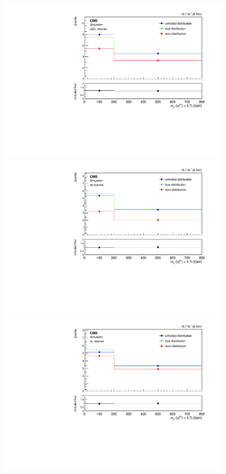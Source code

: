 \begin{figure}[hbtp]
\begin{center}
    \includegraphics[width=0.8\cmsFigWidth]{Figures/Unfolding/MCTests/Mjj_ZZTo2e2m_MadMatrix_PowDistr_FullSample_fr}
     \includegraphics[width=0.8\cmsFigWidth]{Figures/Unfolding/MCTests/Mjj_ZZTo4e_PowMatrix_MadDistr_FullSample_fr}     
    \includegraphics[width=0.8\cmsFigWidth]{Figures/Unfolding/MCTests/Mjj_ZZTo4m_PowMatrix_MadDistr_FullSample_fr}     

\end{center}
\end{figure}
